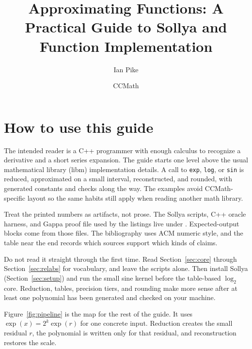 \documentclass[manuscript, nonacm]{acmart}
\title{Approximating Functions: A Practical Guide to Sollya and Function Implementation}
\author{Ian Pike}
\author{CCMath}
\date{}
\begin{document}
    \maketitle



    \section{How to use this guide}

    The intended reader is a C++ programmer with enough calculus to recognize a
    derivative and a short series expansion. The guide starts one level above the
    usual mathematical library (libm) implementation details. A call to \texttt{exp}, \texttt{log}, or
    \texttt{sin} is reduced, approximated on a small interval, reconstructed, and
    rounded, with generated constants and checks along the way. The examples avoid
    CCMath-specific layout so the same habits still apply when reading another math
    library.

    Treat the printed numbers as artifacts, not prose. The Sollya scripts, C++
    oracle harness, and Gappa proof file used by the listings live under
    . Expected-output blocks come from those
    files. The bibliography uses ACM numeric style, and the table near the end
    records which sources support which kinds of claims.

    Do not read it straight through the first time. Read
    Section~\ref{sec:core} through Section~\ref{sec:relabs} for vocabulary, and
    leave the scripts alone. Then install Sollya (Section~\ref{sec:setup}) and run
    the small sine kernel before the table-based $\log_2$ core. Reduction, tables,
    precision tiers, and rounding make more sense after at least one polynomial has
    been generated and checked on your machine.

    Figure~\ref{fig:pipeline} is the map for the rest of the guide. It uses
    $\exp(x) = 2^k \exp(r)$ for one concrete input. Reduction creates the small
    residual $r$, the polynomial is written only for that residual, and
    reconstruction restores the scale.
\end{document}
